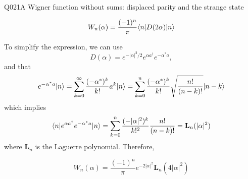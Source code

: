 \begin{entry}{Q021}{A Wigner function without sums: displaced parity and the strange state}
\begin{solution}[c]
\begin{equation}
    W_n(\alpha)  = \frac{(-1)^n}{\pi} \langle n \vert D(2\alpha) \vert n \rangle
\end{equation}


To simplify the expression, we can use  
$$D(\alpha)=e^{-|\alpha|^2/2}e^{\alpha a^\dagger}e^{-\alpha^* a},$$ 
and that 
\begin{equation}
    e^{-\alpha^* a}\lvert n \rangle= \sum_{k=0}^{\infty}\frac{(-\alpha^*)^k}{k!} a^k \lvert n \rangle = \sum_{k=0}^n\frac{(-\alpha^*)^k}{k!} \sqrt{\frac{n!}{(n-k)!}}\lvert n-k \rangle
\end{equation}
which implies
\begin{equation}
    \langle n \rvert e^{\alpha a^\dagger}e^{-\alpha^* a}\lvert n \rangle = \sum_{k=0}^n\frac{(-|\alpha|^2)^{k}}{k!^2} \frac{n!}{(n-k)!} = \mathbf{L}_n(|\alpha|^2)
\end{equation}
where $\mathbf L_n$ is the Laguerre polynomial. Therefore,

\begin{equation}
    W_n(\alpha) = \frac{(-1)^n}{\pi} e^{-2|\alpha|^2}\mathbf{L}_n(4|\alpha|^2)
    \label{q021: Wiegner function fock state}
\end{equation}

\end{solution}

\begin{takeaway}
\end{takeaway}


\end{entry}